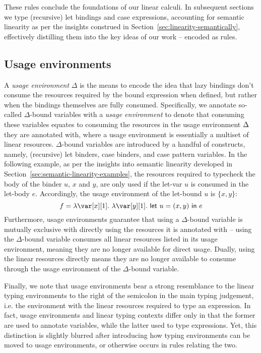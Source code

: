 \documentclass[acmsmall,review]{acmart}
\newcommand{\llet}[2]{\mathsf{let}~#1~\mathsf{in}~#2}
\begin{document}
These rules conclude the foundations of our linear calculi. In subsequent
sections we type (recursive) let bindings and case expressions,
accounting for semantic linearity as per the insights construed in
Section~\ref{sec:linearity-semantically}, effectively distilling them into the
key ideas of our work -- encoded as rules.


\subsection{Usage environments\label{sec:usage-environments}}

A \emph{usage environment} $\Delta$ is the means to encode the idea that lazy
bindings don't consume the resources required by the bound expression when
defined, but rather when the bindings themselves are fully consumed.
Specifically, we annotate so-called $\Delta$-bound variables with a \emph{usage
environment} to denote that consuming these variables equates to consuming the
resources in the usage environment $\Delta$ they are annotated with, where a usage
environment is essentially a multiset of linear resources. $\Delta$-bound
variables are introduced by a handful of constructs, namely, (recursive) let
binders, case binders, and case pattern variables. In the following example, as
per the insights into semantic linearity developed in
Section~\ref{sec:semantic-linearity-examples}, the resources required to
typecheck the body of the binder $u$, $x$ and $y$, are only used if the let-var
$u$ is consumed in the let-body $e$.  Accordingly, the usage environment of
the let-bound $u$ is $\{x,y\}$:
\[
f = \lambda \xl.~\lambda \y[1].~\llet{u = (x,y)}{e}
\]
Furthermore, usage environments guarantee that using a $\Delta$-bound variable
is mutually exclusive with directly using the resources it is annotated with --
using the $\Delta$-bound variable consumes all linear resources listed in its
usage environment, meaning they are no longer available for direct usage.
Dually, using the linear resources directly means they are no longer available
to consume through the usage environment of the $\Delta$-bound variable.

Finally, we note that usage environments bear a strong resemblance to the linear
typing environments to the right of the semicolon in the main typing judgement,
i.e. the environment with the linear resources required to type an expression.
%
In fact, usage environments and linear typing contexts differ only in that the
former are used to annotate variables, while the latter used to type
expressions. Yet, this distinction is slightly blurred after introducing how
typing environments can be moved to usage environments, or otherwise occurs in
rules relating the two.
\end{document}
